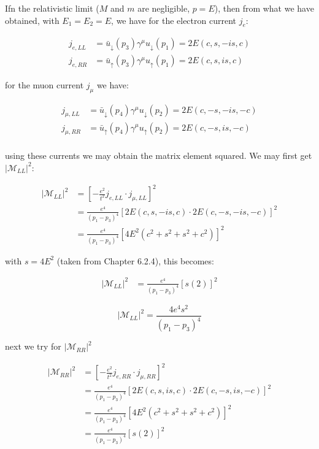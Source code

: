 \documentclass[11pt]{article}
\theoremstyle{definition}
\begin{document}
Ifn the relativistic limit ($M$ and $m$ are negligible, $p = E$), then from what we have obtained, with $E_1=E_2=E$, we have for the electron current $j_e$:

\begin{align}
    j_{e,LL} &=
        \bar{u}_{\downarrow}(p_3)\gamma^{\mu}u_{\downarrow}(p_1) = 
        2E(c, s, -is, c)\\
    j_{e,RR} &=
        \bar{u}_{\uparrow}(p_3)\gamma^{\mu}u_{\uparrow}(p_1) = 
        2E(c, s, is, c)
\end{align}

for the muon current $j_{\mu}$ we have:

\begin{align}
    j_{\mu,LL} &=
    \bar{u}_{\downarrow}(p_4) \gamma^{\mu} u_{\downarrow}(p_2) 
            =
            2E(c, -s, -is, -c)\\
    j_{\mu,RR} &=
    \bar{u}_{\uparrow}(p_4) \gamma^{\mu} u_{\uparrow}(p_2)
            =
            2E(c, -s, is, -c)\\    
\end{align}

using these currents we may obtain the matrix element squared. We may first get $|\mathcal{M}_{LL}|^2$:

\begin{align}
    |\mathcal{M}_{LL}|^2 &= \left[-\frac{e^2}{t^2}j_{e,LL} \cdot j_{\mu,LL}\right]^2\\
    &= \frac{e^4}{(p_1-p_3)^4}\left[2E(c, s, -is, c) \cdot 2E(c, -s, -is, -c)\right]^2\\
    &= \frac{e^4}{(p_1-p_3)^4}\left[4E^2(c^2 + s^2 + s^2 + c^2)\right]^2
\end{align}

with $s=4E^2$ (taken from Chapter 6.2.4), this becomes:

\begin{align}
    |\mathcal{M}_{LL}|^2 &=
    \frac{e^4}{(p_1-p_3)^4}
    \left[s(2)\right]^2
\end{align}

\begin{equation}
\boxed{
    |\mathcal{M}_{LL}|^2
    =
    \frac{4e^4s^2}{(p_1-p_3)^4}
}
\end{equation}

next we try for $|\mathcal{M}_{RR}|^2$

\begin{align}
    |\mathcal{M}_{RR}|^2
    &= 
    \left[-\frac{e^2}{t^2}j_{e,RR} \cdot j_{\mu,RR}\right]^2\\
    &= \frac{e^4}{(p_1-p_3)^4}\left[2E(c, s, is, c) \cdot 2E(c, -s, is, -c)\right]^2\\
    &= \frac{e^4}{(p_1-p_3)^4}\left[4E^2(c^2 + s^2 + s^2 + c^2)\right]^2\\
    &= \frac{e^4}{(p_1-p_3)^4}
    \left[s(2)\right]^2
\end{align}
\end{document}
